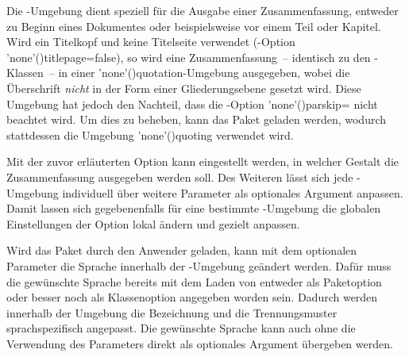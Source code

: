 \begin{DeclareEntity*}{}
\begin{DeclareEntity*}{}
\begin{DeclareEntity*}{}
\begin{Declaration}
\begin{Declaration}
\begin{Declaration}
\begin{Declaration}
\begin{Declaration}
\begin{Declaration}
\begin{Declaration}
Die -Umgebung dient speziell für die Ausgabe einer 
Zusammenfassung, entweder zu Beginn eines Dokumentes oder beispielsweise vor 
einem Teil oder Kapitel. Wird ein Titelkopf und keine Titelseite verwendet 
(\KOMAScript-Option \Option'none'(){titlepage=false}), so 
wird eine Zusammenfassung~-- identisch zu den \KOMAScript-Klassen~-- in einer 
\Environment'none'(){quotation}-Umgebung ausgegeben, 
wobei die Überschrift \emph{nicht} in der Form einer Gliederungsebene gesetzt 
wird. Diese Umgebung hat jedoch den Nachteil, dass die \KOMAScript-Option 
\Option'none'(){parskip=} nicht beachtet 
wird. Um dies zu beheben, kann das Paket  geladen werden, 
wodurch stattdessen die Umgebung \Environment'none'(){quoting} 
verwendet wird.

Mit der zuvor erläuterten Option  kann eingestellt werden, in 
welcher Gestalt die Zusammenfassung ausgegeben werden soll. Des Weiteren lässt 
sich jede -Umgebung individuell über weitere Parameter 
als optionales Argument anpassen. Damit lassen sich gegebenenfalls für eine 
bestimmte -Umgebung die globalen Einstellungen 
der Option  lokal ändern und gezielt anpassen. 

%
Wird das Paket  durch den Anwender geladen, kann mit dem 
optionalen Parameter die 
Sprache innerhalb der -Umgebung geändert werden. Dafür 
muss die gewünschte Sprache bereits mit dem Laden von  entweder 
als Paketoption oder besser noch als Klassenoption angegeben worden sein. 
Dadurch werden innerhalb der Umgebung die Bezeichnung  und 
die Trennungsmuster sprachspezifisch angepasst. Die gewünschte Sprache kann 
auch ohne die Verwendung des Parameters  
direkt als optionales Argument übergeben werden.


\end{Declaration}
\end{Declaration}
\end{Declaration}
\end{Declaration}
\end{Declaration}
\end{Declaration}
\end{Declaration}
\end{DeclareEntity*}
\end{DeclareEntity*}
\end{DeclareEntity*}
